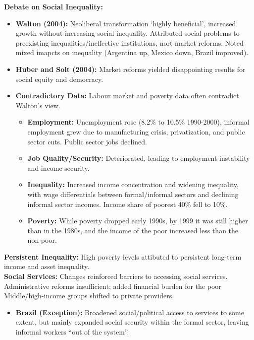 \documentclass{article}
\begin{document}
    \noindent \textbf{Debate on Social Inequality:}
    \begin{itemize}
        \item \textbf{Walton (2004):} Neoliberal transformation `highly
        beneficial', increased growth without increasing social inequality.
        Attributed social problems to preexisting inequalities/ineffective
        institutions, nort market reforms. Noted mixed imapcts on
        inequality (Argentina up, Mexico down, Brazil improved).
        \item \textbf{Huber and Solt (2004):} Market reforms yielded
        disappointing results for social equity and democracy.
        \item \textbf{Contradictory Data:} Labour market and poverty data
        often contradict Walton's view.
        \begin{itemize}
            \item \textbf{Employment:} Unemployment rose (8.2\% to 10.5\%
            1990-2000), informal employment grew due to manufacturing
            crisis, privatization, and public sector cuts. Public sector
            jobs declined.
            \item \textbf{Job Quality/Security:} Deteriorated, leading to
            employment instability and income security.
            \item \textbf{Inequality:} Increased income concentration and
            widening inequality, with wage differentials between
            formal/informal sectors and declining informal sector incomes.
            Income share of poorest 40\% fell to 10\%.
            \item \textbf{Poverty:} While poverty dropped early 1990s, by
            1999 it was still higher than in the 1980s, and the income of
            the poor increased less than the non-poor.
        \end{itemize}
    \end{itemize}

    \noindent \textbf{Persistent Inequality:} High poverty levels attibuted
to persistent long-term income and asset inequality.\\

    \noindent \textbf{Social Services:} Changes reinforced barriers to
accessing social services. Administrative reforms insufficient; added
financial burden for the poor Middle/high-income groups shifted to private
providers.
    \begin{itemize}
        \item \textbf{Brazil (Exception):} Broadened social/political access
        to services to some extent, but mainly expanded social security
        within the formal sector, leaving informal workers ``out of the
        system''.
    \end{itemize}
\end{document}
